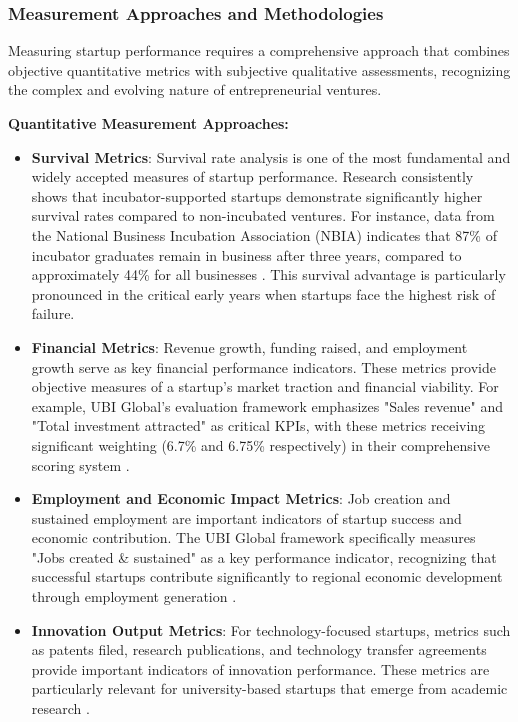 \documentclass[../Main.tex]{subfiles}
\begin{document}
\subsubsection*{Measurement Approaches and Methodologies}
Measuring startup performance requires a comprehensive approach that combines objective quantitative metrics with subjective qualitative assessments, recognizing the complex and evolving nature of entrepreneurial ventures.

\textbf{Quantitative Measurement Approaches:}

\begin{itemize}
    \item \textbf{Survival Metrics}: Survival rate analysis is one of the most fundamental and widely accepted measures of startup performance. Research consistently shows that incubator-supported startups demonstrate significantly higher survival rates compared to non-incubated ventures. For instance, data from the National Business Incubation Association (NBIA) indicates that 87\% of incubator graduates remain in business after three years, compared to approximately 44\% for all businesses \cite{NBIA2012}. This survival advantage is particularly pronounced in the critical early years when startups face the highest risk of failure.
    
    \item \textbf{Financial Metrics}: Revenue growth, funding raised, and employment growth serve as key financial performance indicators. These metrics provide objective measures of a startup's market traction and financial viability. For example, UBI Global's evaluation framework emphasizes "Sales revenue" and "Total investment attracted" as critical KPIs, with these metrics receiving significant weighting (6.7\% and 6.75\% respectively) in their comprehensive scoring system \cite{ubi2019world, ubi2021world}.
    
    \item \textbf{Employment and Economic Impact Metrics}: Job creation and sustained employment are important indicators of startup success and economic contribution. The UBI Global framework specifically measures "Jobs created \& sustained" as a key performance indicator, recognizing that successful startups contribute significantly to regional economic development through employment generation \cite{ubi2019world}.
    
    \item \textbf{Innovation Output Metrics}: For technology-focused startups, metrics such as patents filed, research publications, and technology transfer agreements provide important indicators of innovation performance. These metrics are particularly relevant for university-based startups that emerge from academic research \cite{siegel2003assessing}.
\end{itemize}
\end{document}
